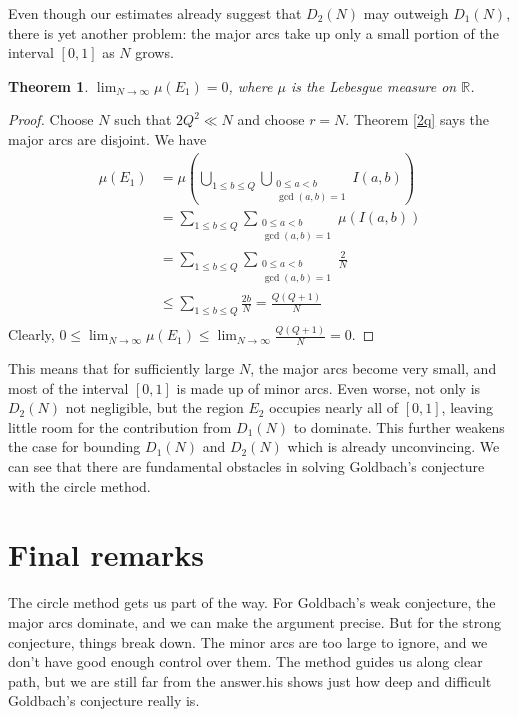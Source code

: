 \documentclass{article}
\newtheorem{theorem}{Theorem}
\begin{document}
Even though our estimates already suggest that $D_2(N)$ may outweigh $D_1(N)$, there is yet another problem: the major arcs take up only a small portion of the interval $[0,1]$ as $N$ grows.
\begin{theorem}\label{density}
    $\displaystyle \lim_{N\rightarrow \infty} \mu(E_1) = 0$, where $\mu$ is the Lebesgue measure on $\mathbb{R}$.
\end{theorem}
\begin{proof}
Choose $N$ such that $2Q^2 \ll N$ and choose $r = N$. Theorem \ref{2q} says the major arcs are disjoint. We have
\begin{align*}
        \mu(E_1) &= \mu\left(\bigcup_{1 \leq b \leq Q}\bigcup_{\substack{0 \leq a < b\\ \gcd(a,b) = 1}} I(a,b)\right)\\
        &= \sum_{1 \leq b \leq Q}\sum_{\substack{0 \leq a < b\\ \gcd(a,b) = 1}} \mu(I(a,b))\\
        &= \sum_{1 \leq b \leq Q}\sum_{\substack{0 \leq a < b\\ \gcd(a,b) = 1}} \frac{2}{N}\\
        &\leq \sum_{1 \leq b \leq Q} \frac{2b}{N} = \frac{Q(Q + 1)}{N}\\
    \end{align*}
    Clearly, $\displaystyle0 \leq \lim_{N\rightarrow \infty} \mu(E_1) \leq \lim_{N\rightarrow \infty} \frac{Q(Q + 1)}{N} = 0$.
\end{proof}
This means that for sufficiently large $N$, the major arcs become very small, and most of the interval $[0,1]$ is made up of minor arcs. Even worse, not only is $D_2(N)$ not negligible, but the region $E_2$ occupies nearly all of $[0,1]$, leaving little room for the contribution from $D_1(N)$ to dominate. This further weakens the case for bounding $D_1(N)$ and $D_2(N)$ which is already unconvincing. We can see that there are fundamental obstacles in solving Goldbach’s conjecture with the circle method.

\section{Final remarks}
The circle method gets us part of the way. For Goldbach's weak conjecture, the major arcs dominate, and we can make the argument precise. But for the strong conjecture, things break down. The minor arcs are too large to ignore, and we don't have good enough control over them. The method guides us along clear path, but we are still far from the answer.his shows just how deep and difficult Goldbach’s conjecture really is.
\end{document}
